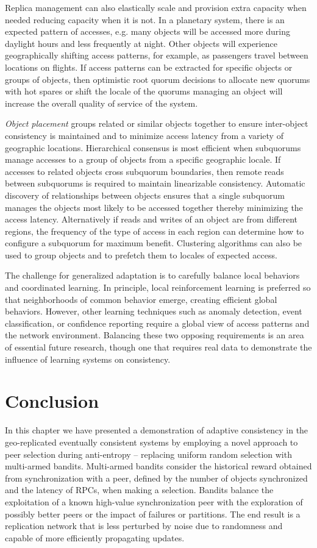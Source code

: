 Replica management can also elastically scale and provision extra capacity when needed reducing capacity when it is not.
In a planetary system, there is an expected pattern of accesses, e.g. many objects will be accessed more during daylight hours and less frequently at night.
Other objects will experience geographically shifting access patterns, for example, as passengers travel between locations on flights.
If access patterns can be extracted for specific objects or groups of objects, then optimistic root quorum decisions to allocate new quorums with hot spares or shift the locale of the quorums managing an object will increase the overall quality of service of the system.

\emph{Object placement} groups related or similar objects together to ensure inter-object consistency is maintained and to minimize access latency from a variety of geographic locations.
Hierarchical consensus is most efficient when subquorums manage accesses to a group of objects from a specific geographic locale.
If accesses to related objects cross subquorum boundaries, then remote reads between subquorums is required to maintain linearizable consistency.
Automatic discovery of relationships between objects ensures that a single subquorum manages the objects most likely to be accessed together thereby minimizing the access latency.
Alternatively if reads and writes of an object are from different regions, the frequency of the type of access in each region can determine how to configure a subquorum for maximum benefit.
Clustering algorithms can also be used to group objects and to prefetch them to locales of expected access.

The challenge for generalized adaptation is to carefully balance local behaviors and coordinated learning.
In principle, local reinforcement learning is preferred so that neighborhoods of common behavior emerge, creating efficient global behaviors.
However, other learning techniques such as anomaly detection, event classification, or confidence reporting require a global view of access patterns and the network environment.
Balancing these two opposing requirements is an area of essential future research, though one that requires real data to demonstrate the influence of learning systems on consistency.

\section{Conclusion}

In this chapter we have presented a demonstration of adaptive consistency in
the geo-replicated eventually consistent systems by employing a novel
approach to peer selection during anti-entropy -- replacing uniform random
selection with multi-armed bandits.
Multi-armed bandits consider the historical reward obtained from
synchronization with a peer, defined by the number of objects synchronized
and the latency of RPCs, when making a selection.
Bandits balance the exploitation of a known high-value synchronization
peer with the exploration of possibly better peers or the impact of
failures or partitions.
The end result is a replication network that is less perturbed by noise
due to randomness and capable of more efficiently propagating updates.

